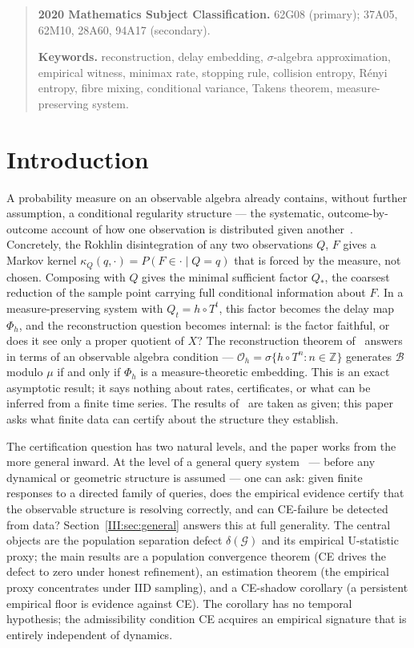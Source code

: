 \begin{quote}\small
\textbf{2020 Mathematics Subject Classification.}
62G08 (primary); 37A05, 62M10, 28A60, 94A17 (secondary).

\textbf{Keywords.}
reconstruction, delay embedding, $\sigma$-algebra approximation,
empirical witness, minimax rate, stopping rule, collision entropy,
Rényi entropy, fibre mixing, conditional variance, Takens theorem,
measure-preserving system.
\end{quote}

\section{Introduction}
\label{III:sec:intro}

A probability measure on an observable algebra already contains, without
further assumption, a conditional regularity structure --- the systematic,
outcome-by-outcome account of how one observation is distributed given
another~\cite{mahon_paper2}.  Concretely, the Rokhlin disintegration of
any two observations $Q$, $F$ gives a Markov kernel
$\kappa_Q(q, \cdot) = P(F \in \cdot \mid Q = q)$ that is forced by the
measure, not chosen.
Composing with $Q$ gives the minimal sufficient factor $Q_*$, the coarsest
reduction of the sample point carrying full conditional information about $F$.
In a measure-preserving system with $Q_t = h \circ T^t$, this factor becomes
the delay map $\Phi_h$, and the reconstruction question becomes internal: is
the factor faithful, or does it see only a proper quotient of $X$?
The reconstruction theorem of~\cite{mahon_paper2} answers in terms of an
observable algebra condition — $\mathcal{O}_h = \sigma\{h \circ T^n : n \in
\mathbb{Z}\}$ generates $\mathcal{B}$ modulo $\mu$ if and only if $\Phi_h$
is a measure-theoretic embedding.
This is an exact asymptotic result; it says nothing about rates, certificates,
or what can be inferred from a finite time series.
The results of~\cite{mahon_paper1,mahon_paper2} are taken as given; this paper
asks what finite data can certify about the structure they establish.

The certification question has two natural levels, and the paper works from
the more general inward.  At the level of a general query
system~\cite{mahon_paper1} --- before any dynamical or geometric structure is
assumed --- one can ask: given finite responses to a directed family of
queries, does the empirical evidence certify that the observable structure is
resolving correctly, and can CE-failure be detected from data?
Section~\ref{III:sec:general} answers this at full generality.
The central objects are the population separation defect $\delta(\mathcal{G})$
and its empirical U-statistic proxy; the main results are a population
convergence theorem (CE drives the defect to zero under honest refinement),
an estimation theorem (the empirical proxy concentrates under IID sampling),
and a CE-shadow corollary (a persistent empirical floor is evidence against
CE).  The corollary has no temporal hypothesis; the admissibility condition CE
acquires an empirical signature that is entirely independent of dynamics.

